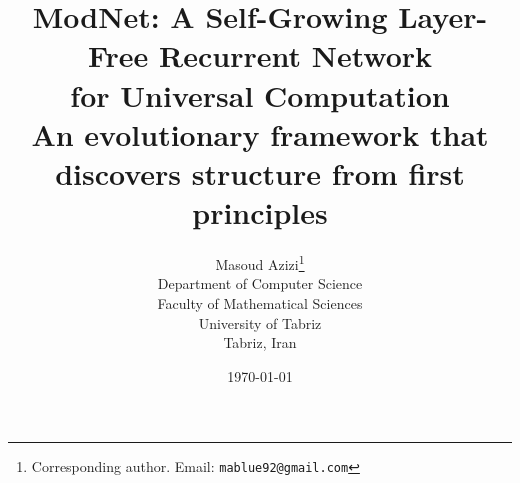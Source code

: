 \documentclass[11pt,a4paper]{report}
\theoremstyle{definition}
\theoremstyle{remark}
\begin{document}
\title{%
  \textbf{ModNet: A Self-Growing Layer-Free Recurrent Network\\[0.3em]
  for Universal Computation}\\[1em]
  \large An evolutionary framework that discovers structure
  from first principles
}

\author{%
  Masoud Azizi\thanks{Corresponding author.
    Email: \texttt{mablue92@gmail.com}} \\[0.5em]
  \small Department of Computer Science \\
  \small Faculty of Mathematical Sciences \\
  \small University of Tabriz \\
  \small Tabriz, Iran
}

\date{\today}

\maketitle
\end{document}
